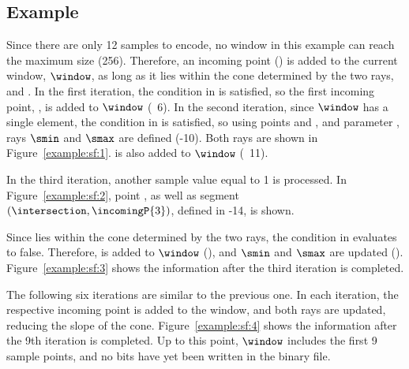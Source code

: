 \clearpage
\subsection{Example}
\label{algo:sf:example}


\vspace{+5pt}
\exampleIntro{\ref{example:sf:1}}


Since there are only 12 samples to encode, no window in this example can reach the maximum size (256). Therefore, an incoming point (\incoming) is added to the current window, $\window$, as long as it lies within the cone determined by the two rays, \smin and \smax. In the first iteration, the condition in  is satisfied, so the first incoming point, , is added to $\window$ (\Line~6). In the second iteration, since $\window$ has a single element, the condition in  is satisfied, so using points \snapshot and , and parameter \maxerror, rays $\smin$ and $\smax$ are defined (-10). Both rays are shown in Figure~\ref{example:sf:1}.  is also added to $\window$ (\Line~11). 


\vspace{+5pt}


In the third iteration, another sample value equal to 1 is processed. In Figure~\ref{example:sf:2}, point , as well as segment $(\intersection,\incomingP{3})$, defined in -14, is shown.


\vspace{+5pt}


\clearpage


Since  lies within the cone determined by the two rays, the condition in  evaluates to false. Therefore,  is added to $\window$ (), and $\smin$ and $\smax$ are updated (). Figure~\ref{example:sf:3} shows the information after the third iteration is completed. 


\vspace{+5pt}


The following six iterations are similar to the previous one. In each iteration, the respective incoming point is added to the window, and both rays are updated, reducing the slope of the cone. Figure~\ref{example:sf:4} shows the information after the 9th iteration is completed. Up to this point, $\window$ includes the first 9 sample points, and no bits have yet been written in the binary file. 


